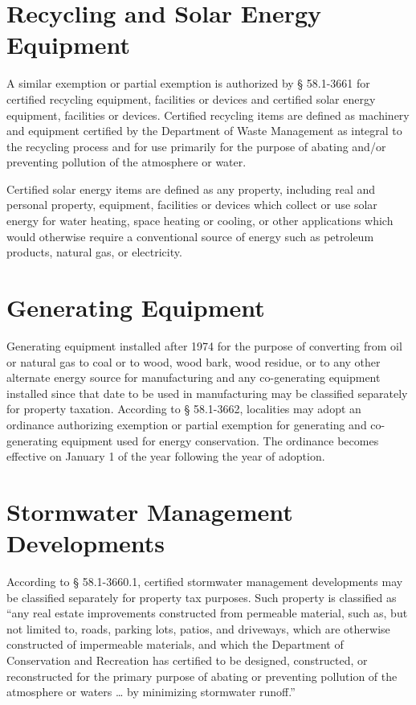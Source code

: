 \documentclass[
]{book}
\begin{document}
\hypertarget{recycling-and-solar-energy-equipment}{%
\section{Recycling and Solar Energy Equipment}\label{recycling-and-solar-energy-equipment}}

A similar exemption or partial exemption is authorized by § 58.1-3661 for certified recycling equipment, facilities or devices and certified solar energy equipment, facilities or devices. Certified recycling items are defined as machinery and equipment certified by the Department of Waste Management as integral to the recycling process and for use primarily for the purpose of abating and/or preventing pollution of the atmosphere or water.

Certified solar energy items are defined as any property, including real and personal property, equipment, facilities or devices which collect or use solar energy for water heating, space heating or cooling, or other applications which would otherwise require a conventional source of energy such as petroleum products, natural gas, or electricity.

\hypertarget{generating-equipment}{%
\section{Generating Equipment}\label{generating-equipment}}

Generating equipment installed after 1974 for the purpose of converting from oil or natural gas to coal or to wood, wood bark, wood residue, or to any other alternate energy source for manufacturing and any co-generating equipment installed since that date to be used in manufacturing may be classified separately for property taxation. According to § 58.1-3662, localities may adopt an ordinance authorizing exemption or partial exemption for generating and co-generating equipment used for energy conservation. The ordinance becomes effective on January 1 of the year following the year of adoption.

\hypertarget{stormwater-management-developments}{%
\section{Stormwater Management Developments}\label{stormwater-management-developments}}

According to § 58.1-3660.1, certified stormwater management developments may be classified separately for property tax purposes. Such property is classified as ``any real estate improvements constructed from permeable material, such as, but not limited to, roads, parking lots, patios, and driveways, which are otherwise constructed of impermeable materials, and which the Department of Conservation and Recreation has certified to be designed, constructed, or reconstructed for the primary purpose of abating or preventing pollution of the atmosphere or waters \ldots{} by minimizing stormwater runoff.''
\end{document}
